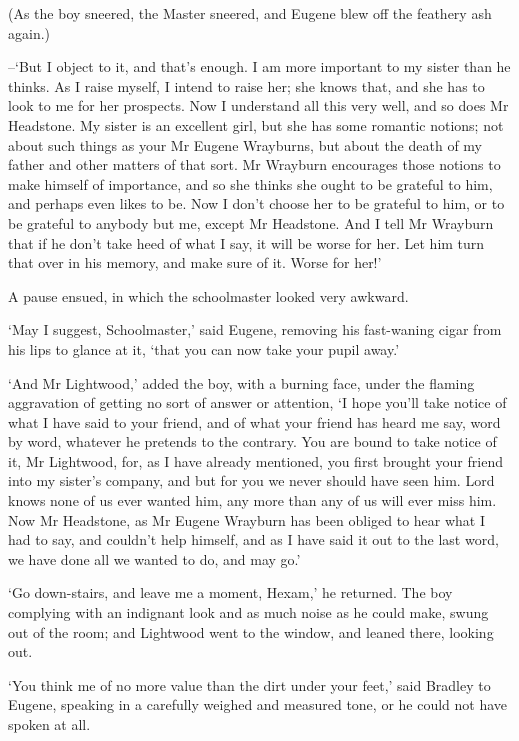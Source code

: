 (As the boy sneered, the Master sneered, and Eugene blew off the
feathery ash again.)

--‘But I object to it, and that’s enough. I am more important to my
sister than he thinks. As I raise myself, I intend to raise her;
she knows that, and she has to look to me for her prospects. Now I
understand all this very well, and so does Mr Headstone. My sister is an
excellent girl, but she has some romantic notions; not about such things
as your Mr Eugene Wrayburns, but about the death of my father and other
matters of that sort. Mr Wrayburn encourages those notions to make
himself of importance, and so she thinks she ought to be grateful to
him, and perhaps even likes to be. Now I don’t choose her to be grateful
to him, or to be grateful to anybody but me, except Mr Headstone. And
I tell Mr Wrayburn that if he don’t take heed of what I say, it will be
worse for her. Let him turn that over in his memory, and make sure of
it. Worse for her!’

A pause ensued, in which the schoolmaster looked very awkward.

‘May I suggest, Schoolmaster,’ said Eugene, removing his fast-waning
cigar from his lips to glance at it, ‘that you can now take your pupil
away.’

‘And Mr Lightwood,’ added the boy, with a burning face, under the
flaming aggravation of getting no sort of answer or attention, ‘I hope
you’ll take notice of what I have said to your friend, and of what
your friend has heard me say, word by word, whatever he pretends to the
contrary. You are bound to take notice of it, Mr Lightwood, for, as I
have already mentioned, you first brought your friend into my sister’s
company, and but for you we never should have seen him. Lord knows none
of us ever wanted him, any more than any of us will ever miss him. Now
Mr Headstone, as Mr Eugene Wrayburn has been obliged to hear what I had
to say, and couldn’t help himself, and as I have said it out to the last
word, we have done all we wanted to do, and may go.’

‘Go down-stairs, and leave me a moment, Hexam,’ he returned. The boy
complying with an indignant look and as much noise as he could make,
swung out of the room; and Lightwood went to the window, and leaned
there, looking out.

‘You think me of no more value than the dirt under your feet,’ said
Bradley to Eugene, speaking in a carefully weighed and measured tone, or
he could not have spoken at all.

